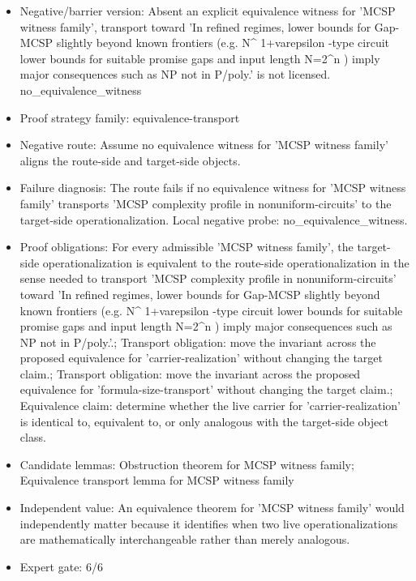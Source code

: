 \documentclass[11pt]{article}
\begin{document}
\begin{itemize}
\item Negative/barrier version: Absent an explicit equivalence witness for 'MCSP witness family', transport toward 'In refined regimes, lower bounds for Gap-MCSP slightly beyond known frontiers (e.g. N\textasciicircum{} 1+varepsilon -type circuit lower bounds for suitable promise gaps and input length N=2\textasciicircum{}n ) imply major consequences such as NP not in P/poly.' is not licensed. no\_equivalence\_witness
\item Proof strategy family: equivalence-transport
\item Negative route: Assume no equivalence witness for 'MCSP witness family' aligns the route-side and target-side objects.
\item Failure diagnosis: The route fails if no equivalence witness for 'MCSP witness family' transports 'MCSP complexity profile in nonuniform-circuits' to the target-side operationalization. Local negative probe: no\_equivalence\_witness.
\item Proof obligations: For every admissible 'MCSP witness family', the target-side operationalization is equivalent to the route-side operationalization in the sense needed to transport 'MCSP complexity profile in nonuniform-circuits' toward 'In refined regimes, lower bounds for Gap-MCSP slightly beyond known frontiers (e.g. N\textasciicircum{} 1+varepsilon -type circuit lower bounds for suitable promise gaps and input length N=2\textasciicircum{}n ) imply major consequences such as NP not in P/poly.'.; Transport obligation: move the invariant across the proposed equivalence for 'carrier-realization' without changing the target claim.; Transport obligation: move the invariant across the proposed equivalence for 'formula-size-transport' without changing the target claim.; Equivalence claim: determine whether the live carrier for 'carrier-realization' is identical to, equivalent to, or only analogous with the target-side object class.
\item Candidate lemmas: Obstruction theorem for MCSP witness family; Equivalence transport lemma for MCSP witness family
\item Independent value: An equivalence theorem for 'MCSP witness family' would independently matter because it identifies when two live operationalizations are mathematically interchangeable rather than merely analogous.
\item Expert gate: 6/6
\end{itemize}
\end{document}
